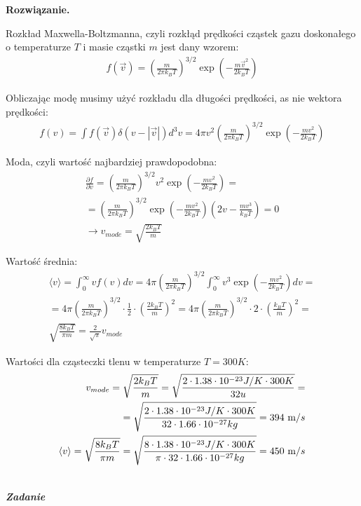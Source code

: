 \documentclass[11pt,a4paper]{article}
\newcounter{zadanie}\newcommand{\zadanie}[1][]{\addtocounter{zadanie}{1} ~\\  {\bf \emph{Zadanie \arabic{zadanie} #1 }} \\}
\newenvironment{solution}{\vspace{1cm} \par\textbf{Rozwiązanie.} \vspace{1cm}}{}
\begin{document}
\begin{solution}

Rozkład Maxwella-Boltzmanna, czyli rozkłąd prędkości cząstek gazu doskonałego 
o temperaturze $T$ i masie cząstki $m$ jest dany wzorem:
\begin{align*}
  f(\vec{v}) = \left( \frac{m}{2\pi k_B T} \right)^{3/2} 
                   \exp\left( -\frac{m \vec{v}^2}{2 k_B T} \right)
\end{align*}

Obliczając modę musimy użyć rozkładu dla długości prędkości, as nie wektora prędkości:
\begin{align*}
  f(v) = \int f(\vec{v}) \delta(v - |\vec{v}|) d^3v = 4\pi v^2 \left( \frac{m}{2\pi k_B T} \right)^{3/2} 
                   \exp\left( -\frac{m v^2}{2 k_B T} \right)
\end{align*}


Moda, czyli wartość najbardziej prawdopodobna:
\begin{align*}
  \frac{\partial f}{\partial v} = \left( \frac{m}{2\pi k_B T} \right)^{3/2} 
                   v^{2}\exp\left( -\frac{m v^2}{2 k_B T} \right) = \\
  = \left( \frac{m}{2\pi k_B T} \right)^{3/2} 
     \exp\left( -\frac{m v^2}{2 k_B T} \right) \left(2v - \frac{m v^3}{k_B T} \right) = 0  \\
  \to v_{mode} = \sqrt{\frac{2 k_B T}{m}}
\end{align*}

Wartość średnia:
\begin{align*}
  \langle v \rangle = \int_0^\infty v f(v) dv = 4\pi \left( \frac{m}{2\pi k_B T} \right)^{3/2} 
                   \int_0^\infty v^3 \exp\left( -\frac{m v^2}{2 k_B T} \right) dv = \\
  = 4\pi \left( \frac{m}{2\pi k_B T} \right)^{3/2} 
     \cdot \frac{1}{2} \cdot \left( \frac{2 k_B T}{m} \right)^2 = 
     4\pi \left( \frac{m}{2\pi k_B T} \right)^{3/2} 
     \cdot 2 \cdot \left( \frac{k_B T}{m} \right)^2 = \\ 
    \sqrt{\frac{8 k_B T}{\pi m}}
  = \frac{2}{\sqrt{\pi}} v_{mode}
\end{align*}


Wartości dla cząsteczki tlenu w temperaturze $T = 300 K$:
\begin{align*}
  v_{mode} = \sqrt{\frac{2 k_B T}{m}} = \sqrt{\frac{2 \cdot 1.38 \cdot 10^{-23} J/K \cdot 300 K}{32 u}} = \\
  = \sqrt{\frac{2 \cdot 1.38 \cdot 10^{-23} J/K \cdot 300 K}{32 \cdot 1.66 \cdot 10^{-27} kg}} = 394~{\text m/s} \\
  \langle v \rangle = \sqrt{\frac{8 k_B T}{\pi m}} = \sqrt{\frac{8 \cdot 1.38 \cdot 10^{-23} J/K \cdot 300 K}{\pi \cdot 32 \cdot 1.66 \cdot 10^{-27} kg}} = 450~{\text m/s}
\end{align*}

\newpage
\end{solution}
\zadanie[]
\end{document}
